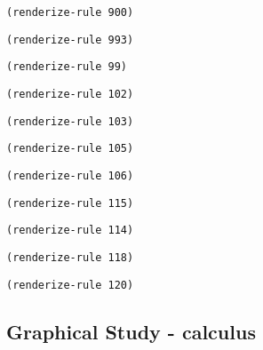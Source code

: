 \documentclass[11pt]{article}
\begin{document}
\begin{enumerate}
\begin{verbatim}
(renderize-rule 900)
\end{verbatim}

\begin{verbatim}
(renderize-rule 993)
\end{verbatim}

\begin{verbatim}
(renderize-rule 99)
\end{verbatim}

\begin{verbatim}
(renderize-rule 102)
\end{verbatim}

\begin{verbatim}
(renderize-rule 103)
\end{verbatim}

\begin{verbatim}
(renderize-rule 105)
\end{verbatim}

\begin{verbatim}
(renderize-rule 106)
\end{verbatim}

\begin{verbatim}
(renderize-rule 115)
\end{verbatim}

\begin{verbatim}
(renderize-rule 114)
\end{verbatim}

\begin{verbatim}
(renderize-rule 118)
\end{verbatim}

\begin{verbatim}
(renderize-rule 120)
\end{verbatim}
\end{enumerate}

\subsection{Graphical Study - calculus}
\label{sec:org08d85ed}
\end{document}
